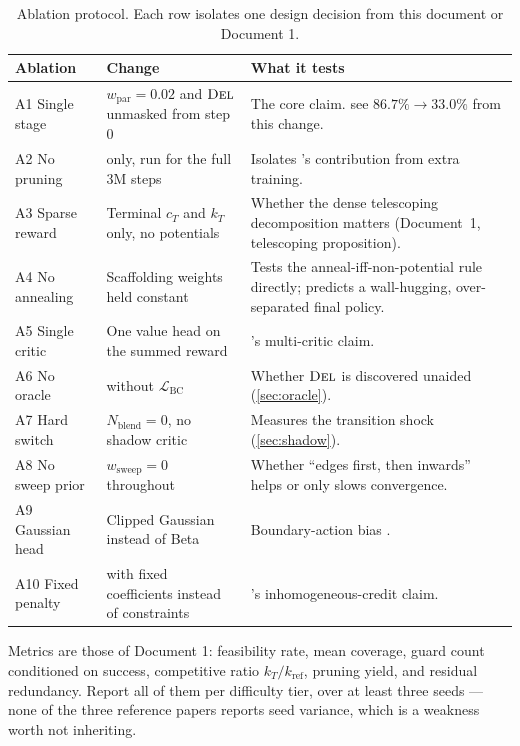 \documentclass[11pt,a4paper]{article}
\begin{document}
\begin{table}[h]
\centering
\small
\caption{Ablation protocol. Each row isolates one design decision from this document or
Document 1.}
\label{tab:ablations}
\begin{tabularx}{\linewidth}{@{}l X X@{}}
\toprule
\textbf{Ablation} & \textbf{Change} & \textbf{What it tests} \\
\midrule
A1 Single stage      & $w_{\mathrm{par}} = 0.02$ and $\textsc{Del}$ unmasked from step $0$ & The core claim. \citet{wang2025dribble} see $86.7\% \to 33.0\%$ from this change. \\
A2 No pruning        & \stageI{} only, run for the full $3$M steps & Isolates \stageII{}'s contribution from extra training. \\
A3 Sparse reward     & Terminal $c_T$ and $k_T$ only, no potentials & Whether the dense telescoping decomposition matters (Document~1, telescoping proposition). \\
A4 No annealing      & Scaffolding weights held constant & Tests the anneal-iff-non-potential rule directly; predicts a wall-hugging, over-separated final policy. \\
A5 Single critic     & One value head on the summed reward & \citet{wang2025vision}'s multi-critic claim. \\
A6 No oracle         & \stageII{} without $\mathcal{L}_{\mathrm{BC}}$ & Whether $\textsc{Del}$ is discovered unaided (\cref{sec:oracle}). \\
A7 Hard switch       & $N_{\mathrm{blend}} = 0$, no shadow critic & Measures the transition shock (\cref{sec:shadow}). \\
A8 No sweep prior    & $w_{\mathrm{sweep}} = 0$ throughout & Whether ``edges first, then inwards'' helps or only slows convergence. \\
A9 Gaussian head     & Clipped Gaussian instead of Beta & Boundary-action bias \cite{chou2017beta}. \\
A10 Fixed penalty    & \stageIII{} with fixed coefficients instead of constraints & \citet{xu2025striker}'s inhomogeneous-credit claim. \\
\bottomrule
\end{tabularx}
\end{table}

Metrics are those of Document 1: feasibility rate, mean coverage, guard count conditioned on
success, competitive ratio $k_T/k_{\mathrm{ref}}$, pruning yield, and residual redundancy.
Report all of them per difficulty tier, over at least three seeds --- none of the three
reference papers reports seed variance, which is a weakness worth not inheriting.
\end{document}
